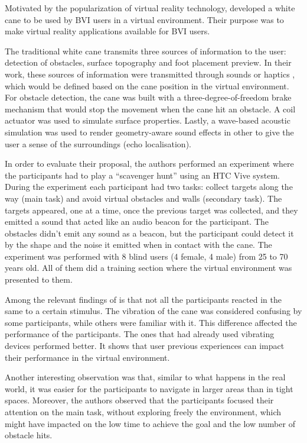 Motivated by the popularization of virtual reality technology,  developed a white cane to be used by BVI users in a virtual environment. Their purpose was to make virtual reality applications available for BVI users. 

The traditional white cane transmits three sources of information to the user: detection of obstacles, surface topography and foot placement preview. In their work, these sources of information were transmitted through sounds or haptics \cite{siu2020virtual}, which would be defined based on the cane position in the virtual environment. For obstacle detection, the cane was built with a three-degree-of-freedom brake mechanism that would stop the movement when the cane hit an obstacle. A coil actuator was used to simulate surface properties. Lastly, a wave-based acoustic simulation was used to render geometry-aware sound effects in other to give the user a sense of the surroundings (echo localisation).

In order to evaluate their proposal, the authors performed an experiment where the participants had to play a “scavenger hunt” using an HTC Vive system. During the experiment each participant had two tasks: collect targets along the way (main task) and avoid virtual obstacles and walls (secondary task). The targets appeared, one at a time, once the previous target was collected, and they emitted a sound that acted like an audio beacon for the participant. The obstacles didn’t emit any sound as a beacon, but the participant could detect it by the shape and the noise it emitted when in contact with the cane. The experiment was performed with 8 blind users (4 female, 4 male) from 25 to 70 years old. All of them did a training section where the virtual environment was presented to them. 

Among the relevant findings of  is that not all the participants reacted in the same to a certain stimulus. The vibration of the cane was considered confusing by some participants, while others were familiar with it. This difference affected the performance of the participants. The ones that had already used vibrating devices performed better. It shows that user previous experiences can impact their performance in the virtual environment.

Another interesting observation was that, similar to what happens in the real world, it was easier for the participants to navigate in larger areas than in tight spaces. Moreover, the authors observed that the participants focused their attention on the main task, without exploring freely the environment, which might have impacted on the low time to achieve the goal and the low number of obstacle hits. 

